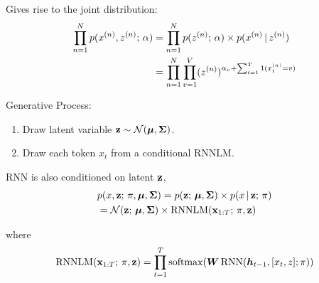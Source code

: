 \begin{frame}

\begin{center}

\end{center}

\air
\air

Gives rise to the joint distribution:
\begin{align*}
     \prod_{n=1}^N p(x^{(n)}, z^{(n)} ; \, \alpha) &= \prod_{n=1}^N p(z^{(n)} ; \, \alpha) \times p(x^{(n)} \,|\, z^{(n)} ) \\
     &= \prod_{n=1}^N \prod_{v=1}^V  (z^{(n)})^{\alpha_v + \sum_{t=1}^T  1(x^{(n)}_t = v)}  \\
     \end{align*}
\end{frame}


\begin{frame}
Generative Process:

\begin{enumerate}
    \item Draw latent variable $\mathbf{z} \sim \mathcal{N}(\boldsymbol{\mu}, \boldsymbol{\Sigma})$.
    \item Draw each token $x_t$ from a conditional RNNLM. 
\end{enumerate}


RNN is also conditioned on latent $\mathbf{z}$,  
\begin{align*}
     & p(x, \mathbf{z} ; \, \pi, \boldsymbol{\mu}, \boldsymbol{\Sigma})  = p(\mathbf{z} ; \, \boldsymbol{\mu}, \boldsymbol{\Sigma}) \times p(x \,|\, \mathbf{z} ; \, \pi) \\ 
      &  = \mathcal{N}(\mathbf{z} ; \, \boldsymbol{\mu}, \boldsymbol{\Sigma})  \times \operatorname*{RNNLM}(\mathbf{x}_{1:T}  ; \, \pi,  \mathbf{z})
\end{align*}

where 
\[ \operatorname*{RNNLM}(\mathbf{x}_{1:T}  ; \, \pi,  \mathbf{z}) = \prod_{t=1}^T \operatorname*{softmax}(\boldsymbol{W} \operatorname*{RNN}(\boldsymbol{h}_{t-1}, [x_t, z]; \pi)) \]

\end{frame}

